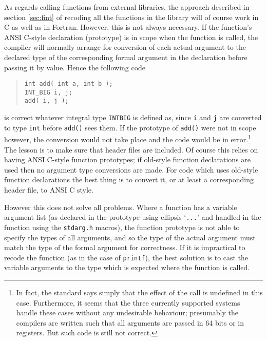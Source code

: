 \documentclass[twoside,11pt]{article}
\renewcommand{\_}{\texttt{\symbol{95}}}
\newcommand{\file}[1]{{\tt #1}}
\newcommand{\cc}[1]{{\tt #1}}
\newenvironment{squote}{\begin{quote}\begin{small}}{\end{small}\end{quote}}
\begin{document}
As regards calling functions from external libraries,
the approach described in section \ref{sec:fint} of
recoding all the functions in the library will of course work in C
as well as in Fortran.
However, this is not always necessary.
If the function's ANSI C-style declaration (prototype) is in scope when
the function is called,
the compiler will normally arrange for conversion
of each actual argument to the declared type of
the corresponding formal argument in the declaration
before passing it by value.
Hence the following code
\begin{squote}
\begin{verbatim}
int add( int a, int b );
INT_BIG i, j;
add( i, j );
\end{verbatim}
\end{squote}
is correct whatever integral type \cc{INT\_BIG} is defined as,
since \cc{i} and \cc{j} are converted to type \cc{int}
before \cc{add()} sees them.
If the prototype of \cc{add()} were not in scope however,
the conversion would not take place and the code would be
in error.\footnote{
   In fact, the standard says simply that the effect of the call is
   undefined in this case.  Furthermore, it seems that the three
   currently supported systems handle these cases without
   any undesirable behaviour; presumably the compilers are written
   such that all arguments are passed in 64 bits or in registers.
   But such code is still not correct.
}
The lesson is to make sure that header files are
included.
Of course this relies on having ANSI C-style function prototypes;
if old-style function declarations are used then no argument type
conversions are made.  For code which uses old-style function
declarations the best thing is to convert it,
or at least a corresponding header file,
to ANSI C style.

However this does not solve all problems.
Where a function has a variable argument list
(as declared in the prototype using ellipsis `\cc{...}'
and handled in the function using the \file{stdarg.h} macros),
the function prototype
is not able to specify the types of all arguments,
and so the type of the actual argument must match the type of
the formal argument for correctness.  If it is impractical
to recode the function (as in the case of \cc{printf}),
the best solution is to cast the variable arguments to the type
which is expected where the function is called.
\end{document}
